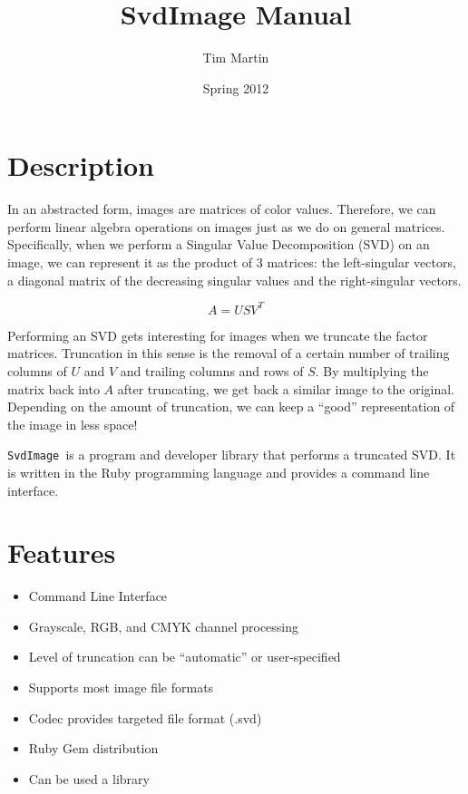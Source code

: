 \documentclass[12pt,letterpaper]{article}
\newcommand{\svdimage}{\texttt{SvdImage }}
\begin{document}
\title{SvdImage Manual}
\author{Tim Martin}
\date{Spring 2012}
\maketitle

\section{Description}
In an abstracted form, images are matrices of color values. Therefore, we can
perform linear algebra operations on images just as we do on general matrices.
Specifically, when we perform a Singular Value Decomposition (SVD) on an image,
we can represent it as the product of 3 matrices: the left-singular vectors,
a diagonal matrix of the decreasing singular values and the right-singular vectors.

\begin{equation}
A=USV^{T}
\end{equation}

Performing an SVD gets interesting for images when we truncate the factor
matrices. Truncation in this sense is the removal of a certain number of
trailing columns of $U$ and $V$ and trailing columns and rows of $S$. By
multiplying the matrix back into $A$ after truncating, we get back a similar
image to the original. Depending on the amount of truncation, we can keep a
``good'' representation of the image in less space! 

\svdimage is a program and developer library that performs a truncated SVD. It
is written in the Ruby programming language and provides a command line
interface.

\section{Features}
\begin{itemize}
\item Command Line Interface
\item Grayscale, RGB, and CMYK channel processing
\item Level of truncation can be ``automatic'' or user-specified
\item Supports most image file formats
\item Codec provides targeted file format (.svd)
\item Ruby Gem distribution
\item Can be used a library
\end{itemize}
\end{document}
